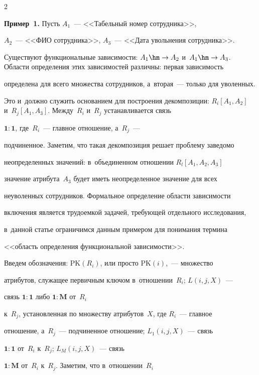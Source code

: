 \begin{multicols}{2}
  \noindent

  \textbf{Пример~1.} Пусть $A_1$~--- <<Табельный номер сотрудника>>,

$A_2$~--- <<ФИО сотрудника>>, $A_3$~--- <<Дата увольнения сотрудника>>.

Существуют функциональные зависимости: $A_1\hm\to A_2$ и~$A_1\hm\to

A_3$. Области определения этих зависимостей различны: первая зависимость

определена для всего множества сотрудников, а~вторая~--- только для уволенных.

Это и~должно служить основанием для построения декомпозиции: $R_i[A_1,

A_2]$ и~$R_j[A_1, A_3]$. Между~$R_i$ и~$R_j$ устанавливается связь

$\mathbf{1}:\mathbf{1}$, где~$R_i$~--- главное отношение, а~$R_j$~---

подчиненное. Заметим, что такая декомпозиция решает проблему заведомо

неопределенных значений: в~объединенном отношении $R_l[A_1, A_2, A_3]$

значение атрибута~$A_3$ будет иметь неопределенное значение для всех

неуволен\-ных сотрудников. Формальное определение области зависимости

включения является трудоемкой задачей, требующей отдельного исследования,

в~данной \mbox{статье} ограничимся данным примером для понимания термина

<<область определения функциональной зависимости>>.



  \medskip



  Введем обозначения: $\mathrm{PK}(R_i)$, или просто $\mathrm{PK}(i)$,~--- множество

атрибутов, служащее первичным ключом в~отношении~$R_i$; $L(i,j,X)$~---

связь $\mathbf{1}:\mathbf{1}$ либо $\mathbf{1}:\mathbf{M}$ от~$R_i$

к~$R_j$, установленная по множеству атрибутов~$X$, где $R_i$~--- главное

отношение, а~$R_j$~--- подчиненное отношение; $L_1(i,j,X)$~--- связь

$\mathbf{1}:\mathbf{1}$ от~$R_i$ к~$R_j$; $L_M(i,j,X)$~--- связь

$\mathbf{1}:\mathbf{M}$ от~$R_i$ к~$R_j$. Заметим, что в~отношении~$R_i$


\end{multicols}
